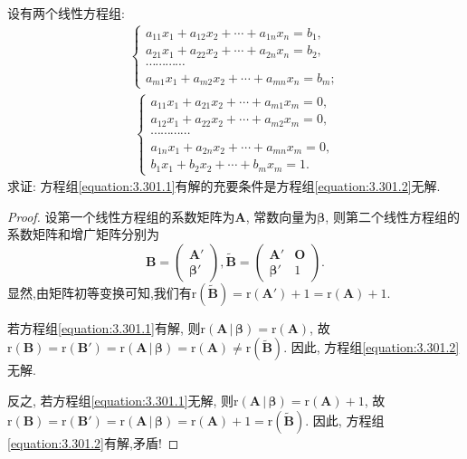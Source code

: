 \documentclass[../../main.tex]{subfiles}%
\begin{document}
\begin{example}
设有两个线性方程组:
\begin{align}\label{equation:3.301.1}
\begin{cases}
a_{11}x_1 + a_{12}x_2+\cdots + a_{1n}x_n = b_1,\\
a_{21}x_1 + a_{22}x_2+\cdots + a_{2n}x_n = b_2,\\
\cdots\cdots\cdots\cdots\\
a_{m1}x_1 + a_{m2}x_2+\cdots + a_{mn}x_n = b_m;
\end{cases} 
\end{align}
\begin{align}\label{equation:3.301.2}
\begin{cases}
a_{11}x_1 + a_{21}x_2+\cdots + a_{m1}x_m = 0,\\
a_{12}x_1 + a_{22}x_2+\cdots + a_{m2}x_m = 0,\\
\cdots\cdots\cdots\cdots\\
a_{1n}x_1 + a_{2n}x_2+\cdots + a_{mn}x_m = 0,\\
b_1x_1 + b_2x_2+\cdots + b_mx_m = 1.
\end{cases}
\end{align}
求证: 方程组\eqref{equation:3.301.1}有解的充要条件是方程组\eqref{equation:3.301.2}无解.
\end{example}
\begin{proof}

设第一个线性方程组的系数矩阵为\(\boldsymbol{A}\), 常数向量为\(\boldsymbol{\beta}\), 则第二个线性方程组的系数矩阵和增广矩阵分别为
\[
\boldsymbol{B}=\begin{pmatrix}
\boldsymbol{A}'\\
\boldsymbol{\beta}'
\end{pmatrix},\widetilde{\boldsymbol{B}}=\begin{pmatrix}
\boldsymbol{A}'&\boldsymbol{O}\\
\boldsymbol{\beta}'&1
\end{pmatrix}.
\]
显然,由矩阵初等变换可知,我们有\(\mathrm{r}(\widetilde{\boldsymbol{B}})=\mathrm{r}(\boldsymbol{A}') + 1=\mathrm{r}(\boldsymbol{A})+1\).

若方程组\eqref{equation:3.301.1}有解, 则\(\mathrm{r}\left( \boldsymbol{A}\,|\,\boldsymbol{\beta } \right) =\mathrm{r}(\boldsymbol{A})\), 故\(\mathrm{r}(\boldsymbol{B})=\mathrm{r}(\boldsymbol{B}')=\mathrm{r}\left( \boldsymbol{A}\,|\,\boldsymbol{\beta } \right) =\mathrm{r}(\boldsymbol{A})\neq\mathrm{r}(\widetilde{\boldsymbol{B}})\). 因此, 方程组\eqref{equation:3.301.2}无解.

反之, 若方程组\eqref{equation:3.301.1}无解, 则\(\mathrm{r}\left( \boldsymbol{A}\,|\,\boldsymbol{\beta } \right) =\mathrm{r}(\boldsymbol{A}) + 1\), 故\(\mathrm{r}(\boldsymbol{B})=\mathrm{r}(\boldsymbol{B}')=\mathrm{r}\left( \boldsymbol{A}\,|\,\boldsymbol{\beta } \right) =\mathrm{r}(\boldsymbol{A})+1=\mathrm{r}(\widetilde{\boldsymbol{B}})\). 因此, 方程组\eqref{equation:3.301.2}有解,矛盾!

\end{proof}
\end{document}
